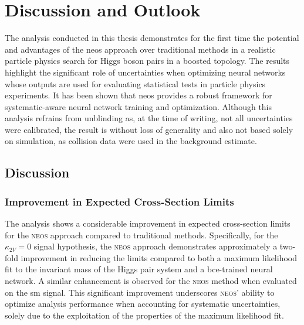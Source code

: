 \chapter{Discussion and Outlook}

The analysis conducted in this thesis demonstrates for the first time the potential and advantages of the \ac{neos} approach over traditional methods in a realistic particle physics search for Higgs boson pairs in a boosted topology. The results highlight the significant role of uncertainties when optimizing neural networks whose outputs are used for evaluating statistical tests in particle physics experiments. It has been shown that \ac{neos} provides a robust framework for systematic-aware neural network training and optimization. Although this analysis refrains from unblinding as, at the time of writing, not all uncertainties were calibrated, the result is without loss of generality and also not based solely on simulation, as collision data were used in the background estimate.


\section{Discussion}

\subsection{Improvement in Expected Cross-Section Limits}

The analysis shows a considerable improvement in expected cross-section limits for the \textsc{neos} approach compared to traditional methods. Specifically, for the $\kappa_{2V} = 0$ signal hypothesis, the \textsc{neos} approach demonstrates approximately a two-fold improvement in reducing the limits compared to both a maximum likelihood fit to the invariant mass of the Higgs pair system \mhh and a \ac{bce}-trained neural network. A similar enhancement is observed for the \textsc{neos} method when evaluated on the \ac{sm} signal. This significant improvement underscores \textsc{neos}' ability to optimize analysis performance when accounting for systematic uncertainties, solely due to the exploitation of the properties of the maximum likelihood fit.

